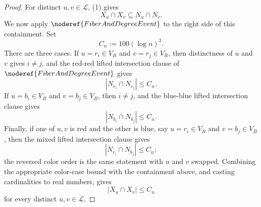 \begin{proof}
For distinct \(u,v\in\mathcal L\), (1) gives
\[
X_u\cap X_v\subseteq N_u\cap N_v.
\]
We now apply \(\noderef{FiberAndDegreeEvent}\) to the right side of this
containment.  Set
\[
C_n:=100(\log n)^3.
\]
There are three cases.  If \(u=r_i\in V_R\) and \(v=r_j\in V_R\), then
distinctness of \(u\) and \(v\) gives \(i\ne j\), and the red-red lifted
intersection clause of \(\noderef{FiberAndDegreeEvent}\) gives
\[
|N_{r_i}\cap N_{r_j}|\le C_n.
\]
If \(u=b_i\in V_B\) and \(v=b_j\in V_B\), then \(i\ne j\), and the blue-blue
lifted intersection clause gives
\[
|N_{b_i}\cap N_{b_j}|\le C_n.
\]
Finally, if one of \(u,v\) is red and the other is blue, say
\(u=r_i\in V_R\) and \(v=b_j\in V_B\), then the mixed lifted intersection
clause gives
\[
|N_{r_i}\cap N_{b_j}|\le C_n;
\]
the reversed color order is the same statement with \(u\) and \(v\) swapped.
Combining the appropriate color-case bound with the containment above, and
casting cardinalities to real numbers, gives
\[
|X_u\cap X_v|\le C_n \tag{5}
\]
for every distinct \(u,v\in\mathcal L\).


\end{proof}
